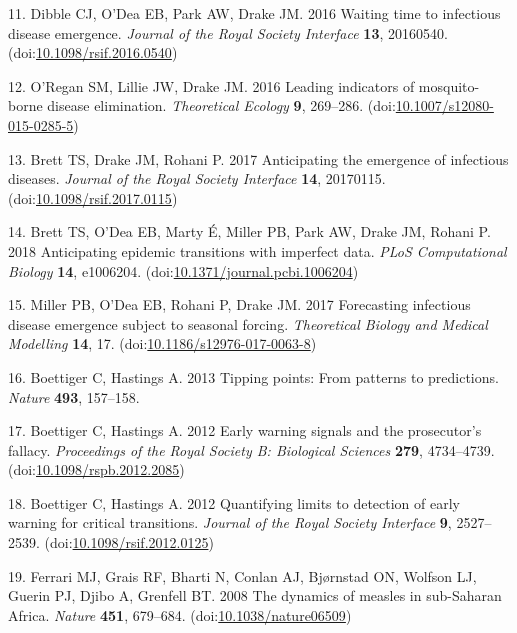 \documentclass[3p]{elsarticle} %
\begin{document}
\leavevmode\hypertarget{ref-Dibble2016}{}%
11. Dibble CJ, O'Dea EB, Park AW, Drake JM. 2016 Waiting time to
infectious disease emergence. \emph{Journal of the Royal Society
Interface} \textbf{13}, 20160540.
(doi:\href{https://doi.org/10.1098/rsif.2016.0540}{10.1098/rsif.2016.0540})

\leavevmode\hypertarget{ref-ORegan2016}{}%
12. O'Regan SM, Lillie JW, Drake JM. 2016 Leading indicators of
mosquito-borne disease elimination. \emph{Theoretical Ecology}
\textbf{9}, 269--286.
(doi:\href{https://doi.org/10.1007/s12080-015-0285-5}{10.1007/s12080-015-0285-5})

\leavevmode\hypertarget{ref-Brett2017}{}%
13. Brett TS, Drake JM, Rohani P. 2017 Anticipating the emergence of
infectious diseases. \emph{Journal of the Royal Society Interface}
\textbf{14}, 20170115.
(doi:\href{https://doi.org/10.1098/rsif.2017.0115}{10.1098/rsif.2017.0115})

\leavevmode\hypertarget{ref-Brett2018}{}%
14. Brett TS, O'Dea EB, Marty É, Miller PB, Park AW, Drake JM, Rohani P.
2018 Anticipating epidemic transitions with imperfect data. \emph{PLoS
Computational Biology} \textbf{14}, e1006204.
(doi:\href{https://doi.org/10.1371/journal.pcbi.1006204}{10.1371/journal.pcbi.1006204})

\leavevmode\hypertarget{ref-Miller2017}{}%
15. Miller PB, O'Dea EB, Rohani P, Drake JM. 2017 Forecasting infectious
disease emergence subject to seasonal forcing. \emph{Theoretical Biology
and Medical Modelling} \textbf{14}, 17.
(doi:\href{https://doi.org/10.1186/s12976-017-0063-8}{10.1186/s12976-017-0063-8})

\leavevmode\hypertarget{ref-Boettiger2013}{}%
16. Boettiger C, Hastings A. 2013 Tipping points: From patterns to
predictions. \emph{Nature} \textbf{493}, 157--158.

\leavevmode\hypertarget{ref-Boettiger2012a}{}%
17. Boettiger C, Hastings A. 2012 Early warning signals and the
prosecutor's fallacy. \emph{Proceedings of the Royal Society B:
Biological Sciences} \textbf{279}, 4734--4739.
(doi:\href{https://doi.org/10.1098/rspb.2012.2085}{10.1098/rspb.2012.2085})

\leavevmode\hypertarget{ref-Boettiger2012}{}%
18. Boettiger C, Hastings A. 2012 Quantifying limits to detection of
early warning for critical transitions. \emph{Journal of the Royal
Society Interface} \textbf{9}, 2527--2539.
(doi:\href{https://doi.org/10.1098/rsif.2012.0125}{10.1098/rsif.2012.0125})

\leavevmode\hypertarget{ref-Ferrari2008}{}%
19. Ferrari MJ, Grais RF, Bharti N, Conlan AJ, Bjørnstad ON, Wolfson LJ,
Guerin PJ, Djibo A, Grenfell BT. 2008 The dynamics of measles in
sub-Saharan Africa. \emph{Nature} \textbf{451}, 679--684.
(doi:\href{https://doi.org/10.1038/nature06509}{10.1038/nature06509})
\end{document}
